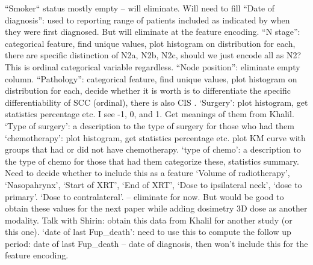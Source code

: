 \documentclass{article}%
\begin{document}
%
“Smoker“ status mostly empty – will eliminate. Will need to fill %
\newline%
\newline%
%
“Date of diagnosis”: used to reporting range of patients included as indicated by when they were first diagnosed. But will eliminate at the feature encoding. %
\newline%
\newline%
%
“N stage”: categorical feature, find unique values, plot histogram on distribution for each, there are specific distinction of N2a, N2b, N2c, should we just encode all as N2? This is ordinal categorical variable regardless. %
\newline%
\newline%
%
“Node position”: eliminate empty column. %
\newline%
\newline%
%
“Pathology”: categorical feature, find unique values, plot histogram on distribution for each, decide whether it is worth is to differentiate the specific differentiability of SCC (ordinal), there is also CIS . %
\newline%
\newline%
%
‘Surgery’: plot histogram, get statistics percentage etc. I see {-}1, 0, and 1. Get meanings of them from Khalil. %
\newline%
\newline%
%
‘Type of surgery’: a description to the type of surgery for those who had them %
\newline%
\newline%
%
‘chemotherapy’: plot histogram, get statistics percentage etc. plot KM curve with groups that had or did not have chemotherapy. %
\newline%
\newline%
%
‘type of chemo’: a description to the type of chemo for those that had them categorize these, statistics summary. Need to decide whether to include this as a feature %
\newline%
\newline%
%
‘Volume of radiotherapy’, ‘Nasopahrynx’, ‘Start of XRT’, ‘End of XRT’, ‘Dose to ipsilateral neck’, ‘dose to primary’. ‘Dose to contralateral’. – eliminate for now. But would be good to obtain these values for the next paper while adding dosimetry 3D dose as another modality. Talk with Shirin: obtain this data from Khalil for another study (or this one). %
\newline%
\newline%
%
‘date of last Fup\_death’: need to use this to compute the follow up period: date of last Fup\_death – date of diagnosis, then won’t include this for the feature encoding. %
\end{document}
